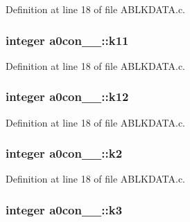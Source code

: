 Definition at line 18 of file A\+B\+L\+K\+D\+A\+T\+A.\+c.

\subsubsection[{\texorpdfstring{k11}{k11}}]{\setlength{\rightskip}{0pt plus 5cm}integer a0con\+\_\+\_\+\+::k11}\hypertarget{structa0con__1___a3746a8fa31ae250c18150ce10b0a5ece}{}\label{structa0con__1___a3746a8fa31ae250c18150ce10b0a5ece}


Definition at line 18 of file A\+B\+L\+K\+D\+A\+T\+A.\+c.

\subsubsection[{\texorpdfstring{k12}{k12}}]{\setlength{\rightskip}{0pt plus 5cm}integer a0con\+\_\+\_\+\+::k12}\hypertarget{structa0con__1___ae7548365e83c840628af8b4c41acd0e6}{}\label{structa0con__1___ae7548365e83c840628af8b4c41acd0e6}


Definition at line 18 of file A\+B\+L\+K\+D\+A\+T\+A.\+c.

\subsubsection[{\texorpdfstring{k2}{k2}}]{\setlength{\rightskip}{0pt plus 5cm}integer a0con\+\_\+\_\+\+::k2}\hypertarget{structa0con__1___a21267212a3c28af51ae0427ee16961bb}{}\label{structa0con__1___a21267212a3c28af51ae0427ee16961bb}


Definition at line 18 of file A\+B\+L\+K\+D\+A\+T\+A.\+c.

\subsubsection[{\texorpdfstring{k3}{k3}}]{\setlength{\rightskip}{0pt plus 5cm}integer a0con\+\_\+\_\+\+::k3}\hypertarget{structa0con__1___a1ca617a8aded2c01162307042bf177d6}{}\label{structa0con__1___a1ca617a8aded2c01162307042bf177d6}


